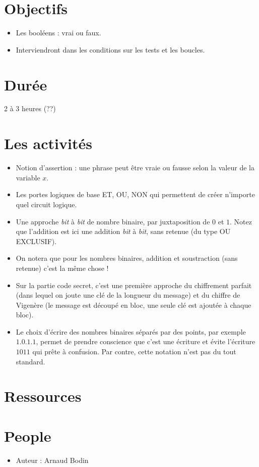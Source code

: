 \documentclass[class=report,crop=false, 12pt]{standalone}
\begin{document}



\section*{Objectifs}

\begin{itemize}
  \item Les booléens : vrai ou faux.
  \item Interviendront dans les conditions sur les tests et les boucles.
\end{itemize}


\section*{Durée}

2 à 3 heures (??)

\section*{Les activités}

\begin{itemize}
  \item Notion d'assertion : une phrase peut être vraie ou fausse selon la valeur de la variable $x$.
  \item Les portes logiques de base ET, OU, NON qui permettent de créer n'importe quel circuit logique.
  \item Une approche \emph{bit} à \emph{bit} de nombre binaire, par juxtaposition de $0$ et $1$. Notez que l'addition est ici une addition \emph{bit} à \emph{bit}, sans retenue (du type OU EXCLUSIF).
  \item On notera que pour les nombres binaires, addition et soustraction (sans retenue) c'est la même chose !
  \item Sur la partie code secret, c'est une première approche du chiffrement parfait (dans lequel on joute une clé de la longueur du message) et du chiffre de Vigenère (le message est découpé en bloc, une seule clé est ajoutée à chaque bloc).
  \item Le choix d'écrire des nombres binaires séparés par des points, par exemple $1.0.1.1$, permet de prendre conscience que c'est une écriture et évite l'écriture $1011$ qui prête à confusion. Par contre, cette notation n'est pas du tout standard.
\end{itemize}


\section*{Ressources}


\section*{People}

\begin{itemize}
  \item Auteur : Arnaud Bodin
\end{itemize}
\end{document}
